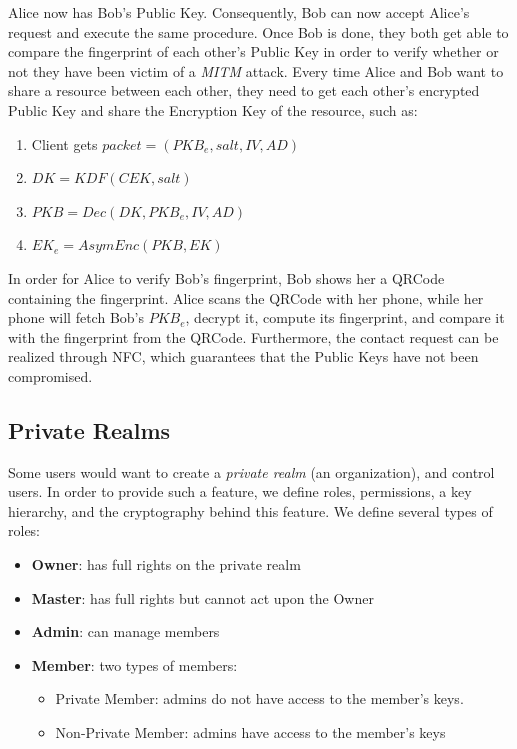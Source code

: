 \documentclass[a4paper,9pt,twoside]{article}
\begin{document}
    Alice now has Bob's Public Key. Consequently, Bob can now accept Alice's request and execute 
the same procedure. Once Bob is done, they both get able to compare the fingerprint of each other's 
Public Key in order to verify whether or not they have been victim of a \emph{MITM} attack. Every time Alice 
and Bob want to share a resource between each other, they need to get each other's encrypted Public Key and 
share the Encryption Key of the resource, such as:

\begin{enumerate}
\itemsep0em
\item Client gets $packet=(PKB_e, salt, IV, AD)$
\item $DK=KDF(CEK, salt)$
\item $PKB=Dec(DK, PKB_e, IV, AD)$
\item $EK_e=AsymEnc(PKB, EK)$
\end{enumerate}

In order for Alice to verify Bob's fingerprint, Bob shows her a QRCode containing the fingerprint. Alice scans 
the QRCode with her phone, while her phone will fetch Bob's $PKB_e$, decrypt it, compute its fingerprint, and 
compare it with the fingerprint from the QRCode. Furthermore, the contact request can be realized through NFC, 
which guarantees that the Public Keys have not been compromised.

\subsection{Private Realms}

    Some users would want to create a \emph{private realm} (an organization), and control users. 
In order to provide such a feature, we define roles, permissions, a key hierarchy, and 
the cryptography behind this feature. We define several types of roles:

\begin{itemize}
\itemsep0em
\item \textbf{Owner}: has full rights on the private realm
\item \textbf{Master}: has full rights but cannot act upon the Owner
\item \textbf{Admin}: can manage members
\item \textbf{Member}: two types of members:
\begin{itemize}
\item Private Member: admins do not have access to the member's keys.
\item Non-Private Member: admins have access to the member's keys
\end{itemize}
\end{itemize}
\end{document}
